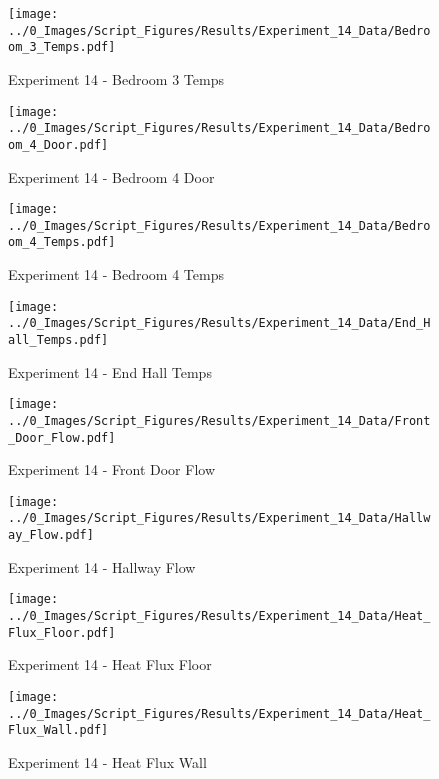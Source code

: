 	\clearpage

	\begin{figure}[H]
		\centering
		\texttt{[image: ../0\_Images/Script\_Figures/Results/Experiment\_14\_Data/Bedroom\_3\_Temps.pdf]}
		\caption[]{Experiment 14 - Bedroom 3 Temps}
	\end{figure}
 

	\begin{figure}[H]
		\centering
		\texttt{[image: ../0\_Images/Script\_Figures/Results/Experiment\_14\_Data/Bedroom\_4\_Door.pdf]}
		\caption[]{Experiment 14 - Bedroom 4 Door}
	\end{figure}
 
	\clearpage

	\begin{figure}[H]
		\centering
		\texttt{[image: ../0\_Images/Script\_Figures/Results/Experiment\_14\_Data/Bedroom\_4\_Temps.pdf]}
		\caption[]{Experiment 14 - Bedroom 4 Temps}
	\end{figure}
 

	\begin{figure}[H]
		\centering
		\texttt{[image: ../0\_Images/Script\_Figures/Results/Experiment\_14\_Data/End\_Hall\_Temps.pdf]}
		\caption[]{Experiment 14 - End Hall Temps}
	\end{figure}
 
	\clearpage

	\begin{figure}[H]
		\centering
		\texttt{[image: ../0\_Images/Script\_Figures/Results/Experiment\_14\_Data/Front\_Door\_Flow.pdf]}
		\caption[]{Experiment 14 - Front Door Flow}
	\end{figure}
 

	\begin{figure}[H]
		\centering
		\texttt{[image: ../0\_Images/Script\_Figures/Results/Experiment\_14\_Data/Hallway\_Flow.pdf]}
		\caption[]{Experiment 14 - Hallway Flow}
	\end{figure}
 
	\clearpage

	\begin{figure}[H]
		\centering
		\texttt{[image: ../0\_Images/Script\_Figures/Results/Experiment\_14\_Data/Heat\_Flux\_Floor.pdf]}
		\caption[]{Experiment 14 - Heat Flux Floor}
	\end{figure}
 

	\begin{figure}[H]
		\centering
		\texttt{[image: ../0\_Images/Script\_Figures/Results/Experiment\_14\_Data/Heat\_Flux\_Wall.pdf]}
		\caption[]{Experiment 14 - Heat Flux Wall}
	\end{figure}
 
